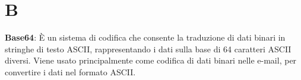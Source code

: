 \section{B}
\textbf{Base64}: È un sistema di codifica che consente la traduzione di dati binari in stringhe di testo ASCII, rappresentando i dati sulla base di 64 caratteri ASCII diversi. Viene usato principalmente come codifica di dati binari nelle e-mail, per convertire i dati nel formato ASCII.